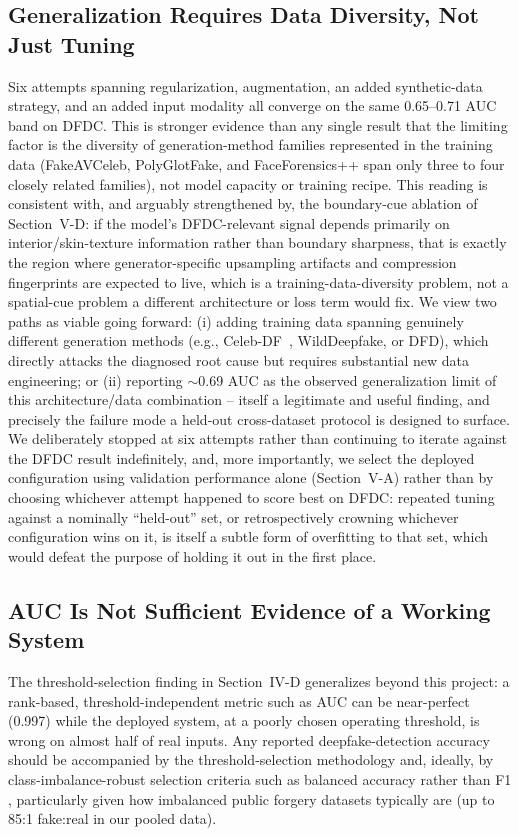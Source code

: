 \documentclass[conference]{IEEEtran}
\begin{document}
\subsection{Generalization Requires Data Diversity, Not Just Tuning}
Six attempts spanning regularization, augmentation, an added synthetic-data
strategy, and an added input modality all converge on the same 0.65--0.71
AUC band on DFDC. This is stronger evidence than any single result that the
limiting factor is the diversity of generation-method families represented
in the training data (FakeAVCeleb, PolyGlotFake, and FaceForensics++ span
only three to four closely related families), not model capacity or
training recipe. This reading is consistent with, and arguably strengthened
by, the boundary-cue ablation of Section~V-D: if the model's DFDC-relevant
signal depends primarily on interior/skin-texture information rather than
boundary sharpness, that is exactly the region where generator-specific
upsampling artifacts and compression fingerprints are expected to live,
which is a training-data-diversity problem, not a spatial-cue problem a
different architecture or loss term would fix. We view two paths as viable
going forward: (i) adding
training data spanning genuinely different generation methods (e.g.,
Celeb-DF~\cite{li2020celebdf}, WildDeepfake, or DFD), which directly attacks
the diagnosed root cause but requires substantial new data engineering; or
(ii) reporting $\sim$0.69 AUC as the observed generalization limit of this
architecture/data combination -- itself a legitimate and useful finding,
and precisely the failure mode a held-out cross-dataset protocol is
designed to surface. We deliberately stopped at six attempts rather than
continuing to iterate against the DFDC result indefinitely, and, more
importantly, we select the deployed configuration using validation
performance alone (Section~V-A) rather than by choosing whichever attempt
happened to score best on DFDC: repeated tuning against a nominally
``held-out'' set, or retrospectively crowning whichever configuration wins
on it, is itself a subtle form of overfitting to that set, which would
defeat the purpose of holding it out in the first place.

\subsection{AUC Is Not Sufficient Evidence of a Working System}
The threshold-selection finding in Section~IV-D generalizes beyond this
project: a rank-based, threshold-independent metric such as AUC can be
near-perfect (0.997) while the deployed system, at a poorly chosen
operating threshold, is wrong on almost half of real inputs. Any reported
deepfake-detection accuracy should be accompanied by the threshold-selection
methodology and, ideally, by class-imbalance-robust selection criteria such
as balanced accuracy rather than F1 \cite{chicco2020mcc}, particularly given how imbalanced
public forgery datasets typically are (up to 85:1 fake:real in our pooled
data).
\end{document}
